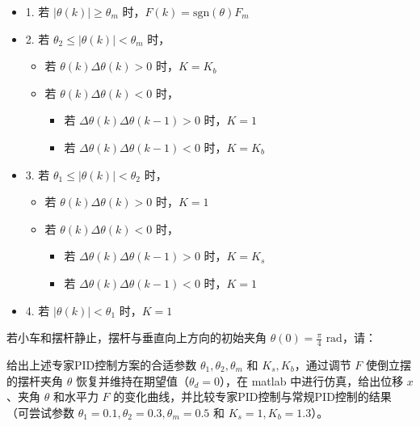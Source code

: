 \documentclass[12pt,a4paper,UTF8]{article}
\begin{document}
\begin{itemize}

\item 1. 若 $|\theta(k)| \geq \theta_m$ 时，$F(k) = \text{sgn}(\theta) F_m$

\item 2. 若 $\theta_2 \leq |\theta(k)| < \theta_m$ 时，
    \begin{itemize}
        \item 若 $\theta(k) \Delta \theta(k) > 0$ 时，$K = K_b$
        \item 若 $\theta(k) \Delta \theta(k) < 0$ 时，
            \begin{itemize}
                \item 若 $\Delta \theta(k) \Delta \theta(k-1) > 0$ 时，$K = 1$
                \item 若 $\Delta \theta(k) \Delta \theta(k-1) < 0$ 时，$K = K_b$
            \end{itemize}
    \end{itemize}

\item 3. 若 $\theta_1 \leq |\theta(k)| < \theta_2$ 时，
    \begin{itemize}
        \item 若 $\theta(k) \Delta \theta(k) > 0$ 时，$K = 1$
        \item 若 $\theta(k) \Delta \theta(k) < 0$ 时，
            \begin{itemize}
                \item 若 $\Delta \theta(k) \Delta \theta(k-1) > 0$ 时，$K = K_s$
                \item 若 $\Delta \theta(k) \Delta \theta(k-1) < 0$ 时，$K = 1$
            \end{itemize}
    \end{itemize}

\item 4. 若 $|\theta(k)| < \theta_1$ 时，$K = 1$
    
\end{itemize}


若小车和摆杆静止，摆杆与垂直向上方向的初始夹角 $\theta(0) = \frac{\pi}{4} \text{ rad}$，请：


\begin{problem}
给出上述专家PID控制方案的合适参数 $\theta_1, \theta_2, \theta_m$ 和 $K_s, K_b$，通过调节 $F$ 使倒立摆的摆杆夹角 $\theta$ 恢复并维持在期望值（$\theta_d = 0$），在 matlab 中进行仿真，给出位移 $x$、夹角 $\theta$ 和水平力 $F$ 的变化曲线，并比较专家PID控制与常规PID控制的结果（可尝试参数 $\theta_1 = 0.1, \theta_2 = 0.3, \theta_m = 0.5$ 和 $K_s = 1, K_b = 1.3$）。
\end{problem}
\end{document}
